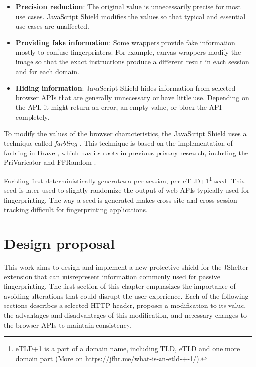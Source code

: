 \begin{itemize}
	\item \textbf{Precision reduction}: The original value is unnecessarily precise for most use cases. JavaScript Shield modifies the values so that typical and essential use cases are unaffected.
	\item \textbf{Providing fake information}: Some wrappers provide fake information mostly to confuse fingerprinters. For example, canvas wrappers modify the image so that the exact instructions produce a different result in each session and for each domain.
	\item \textbf{Hiding information}: JavaScript Shield hides information from selected browser APIs that are generally unnecessary or have little use. Depending on the API, it might return an error, an empty value, or block the API completely.
\end{itemize}

To modify the values of the browser characteristics, the JavaScript Shield uses a technique called \emph{farbling} \cite{JShelterPaper}. This technique is based on the implementation of farbling in Brave \cite{BraveFingerprintingDefences2}, which has its roots in previous privacy research, including the PriVaricator \cite{PriVaricator} and FPRandom \cite{FPRandom}.

Farbling first deterministically generates a per-session, per-eTLD+1\footnote{eTLD+1 is a part of a domain name, including TLD, eTLD and one more domain part (More on \url{https://jfhr.me/what-is-an-etld-+-1/}).} seed. This seed is later used to slightly randomize the output of web APIs typically used for fingerprinting. The way a seed is generated makes cross-site and cross-session tracking difficult for fingerprinting applications.


\chapter{Design proposal}
\label{Chapter:Design}


This work aims to design and implement a new protective shield for the JShelter extension that can misrepresent information commonly used for passive fingerprinting. The first section of this chapter emphasizes the importance of avoiding alterations that could disrupt the user experience. Each of the following sections describes a selected HTTP header, proposes a modification to its value, the advantages and disadvantages of this modification, and necessary changes to the browser APIs to maintain consistency.

